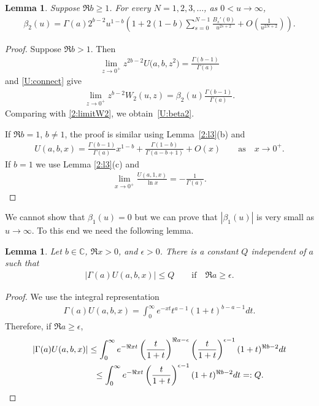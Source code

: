 \documentclass[pdftex]{sigma}
\newcommand{\C}{\mathbb{C}}
\numberwithin{equation}{section}
\newtheorem{Lemma}[Theorem]{Lemma}
{ \theoremstyle{definition}
\newtheorem{Remarks}[Theorem]{Remarks} }
\begin{document}
\begin{Lemma}\label{U:l1}
Suppose $\Re b\ge 1$. For every $N=1,2,3,\dots$, as $0<u\to\infty$,
\begin{gather}\label{U:beta2}
\beta_2(u)=\Gamma(a)2^{b-2}u^{1-b}\left(1+2(1-b)\sum_{s=0}^{N-1}\frac{B_s'(0)}{u^{2s+2}}+O\left(\frac{1}{u^{2N+2}}\right)\right).
\end{gather}
\end{Lemma}

\begin{proof}
Suppose $\Re b>1$.
Then \cite[(13.2.18)]{NIST}
\begin{gather*}%
\lim_{z\to0^+}z^{2b-2}U\big(a,b,z^2\big)=\frac{\Gamma(b-1)}{\Gamma(a)}
\end{gather*}
and \eqref{U:connect} give
\begin{gather*}%
\lim_{z\to 0^+} z^{b-2} W_2(u,z)= \beta_2(u) \frac{\Gamma(b-1)}{\Gamma(a)} .
\end{gather*}
Comparing with \eqref{2:limitW2}, we obtain~\eqref{U:beta2}.

If $\Re b=1$, $b\ne 1$, the proof is similar using Lemma~\ref{2:l3}(b) and~\cite[(13.2.18)]{NIST}
\begin{gather*}%
U(a,b,x)=\frac{\Gamma(b-1)}{\Gamma(a)} x^{1-b}+\frac{\Gamma(1-b)}{\Gamma(a-b+1)}+O(x)\qquad\text{as} \quad x\to0^+.
\end{gather*}
If $b=1$ we use Lemma \ref{2:l3}(c) and \cite[(13.2.19)]{NIST}
\begin{gather*}%
\lim_{x\to0^+} \frac{U(a,1,x)}{\ln x} =-\frac{1}{\Gamma(a)} .\tag*{\qed}
\end{gather*}
\renewcommand{\qed}{}
\end{proof}

We cannot show that $\beta_1(u)=0$ but we can prove that $|\beta_1(u)|$ is very small as $u\to\infty$.
To this end we need the following lemma.

\begin{Lemma}\label{U:l2}
Let $b\in\C$, $\Re x>0$, and $\epsilon>0$. There is a constant $Q$ independent of $a$ such that
\begin{gather*} |\Gamma(a) U(a,b,x)|\le Q \qquad\text{if} \quad \Re a\ge \epsilon. \end{gather*}
\end{Lemma}

\begin{proof}
We use the integral representation \cite[(13.4.4)]{NIST}
\begin{gather*}
\Gamma(a)U(a,b,x)=\int_0^\infty e^{-xt}t^{a-1}(1+t)^{b-a-1} dt .
\end{gather*}
Therefore, if $\Re a\ge \epsilon$,
\begin{gather*}
 |\Gamma(a)U(a,b,x)| \le \int_0^\infty e^{-\Re x t}\left(\frac{t}{1+t}\right)^{\Re a-\epsilon}\left(\frac{t}{1+t}\right)^{\epsilon-1}(1+t)^{\Re b-2} dt\\
\hphantom{|\Gamma(a)U(a,b,x)|}{} \le \int_0^\infty e^{-\Re x t}\left(\frac{t}{1+t}\right)^{\epsilon-1}(1+t)^{\Re b-2} dt = :Q .\tag*{\qed}
 \end{gather*}
\renewcommand{\qed}{}
\end{proof}
\end{document}
